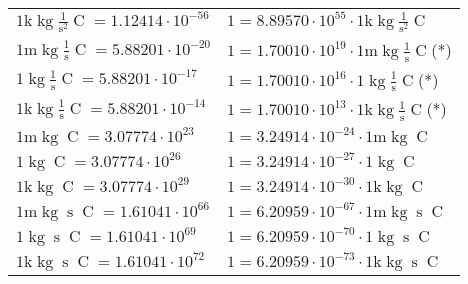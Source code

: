 \begin{center}
\begin{longtable}{l l}
{\color{gray}$1 \bm{\mathrm{ k}}\operatorname{kg}{}\frac1{\operatorname{s}^2}{\operatorname{C}}{} = 1.12414\cdot10^{-56} $}   & {\color{gray}$ 1 = 8.89570\cdot10^{55} \cdot 1 \bm{\mathrm{ k}}\operatorname{kg}{}\frac1{\operatorname{s}^2}{\operatorname{C}}{}$}  \\
{\color{gray}$1 \bm{\mathrm{ m}}\operatorname{kg}{}\frac1{\operatorname{s}}{\operatorname{C}}{} = 5.88201\cdot10^{-20} $}   & {\color{gray}$ 1 = 1.70010\cdot10^{19} \cdot 1 \bm{\mathrm{ m}}\operatorname{kg}{}\frac1{\operatorname{s}}{\operatorname{C}}{}$}\quad(*)\\
{\color{black}$1 \bm{\mathrm{ }}\operatorname{kg}{}\frac1{\operatorname{s}}{\operatorname{C}}{} = 5.88201\cdot10^{-17} $}   & {\color{black}$ 1 = 1.70010\cdot10^{16} \cdot 1 \bm{\mathrm{ }}\operatorname{kg}{}\frac1{\operatorname{s}}{\operatorname{C}}{}$}\quad(*)\\
{\color{gray}$1 \bm{\mathrm{ k}}\operatorname{kg}{}\frac1{\operatorname{s}}{\operatorname{C}}{} = 5.88201\cdot10^{-14} $}   & {\color{gray}$ 1 = 1.70010\cdot10^{13} \cdot 1 \bm{\mathrm{ k}}\operatorname{kg}{}\frac1{\operatorname{s}}{\operatorname{C}}{}$}\quad(*)\\
{\color{gray}$1 \bm{\mathrm{ m}}\operatorname{kg}{}{}{\operatorname{C}}{} = 3.07774\cdot10^{23} $}   & {\color{gray}$ 1 = 3.24914\cdot10^{-24} \cdot 1 \bm{\mathrm{ m}}\operatorname{kg}{}{}{\operatorname{C}}{}$}  \\
{\color{black}$1 \bm{\mathrm{ }}\operatorname{kg}{}{}{\operatorname{C}}{} = 3.07774\cdot10^{26} $}   & {\color{black}$ 1 = 3.24914\cdot10^{-27} \cdot 1 \bm{\mathrm{ }}\operatorname{kg}{}{}{\operatorname{C}}{}$}  \\
{\color{gray}$1 \bm{\mathrm{ k}}\operatorname{kg}{}{}{\operatorname{C}}{} = 3.07774\cdot10^{29} $}   & {\color{gray}$ 1 = 3.24914\cdot10^{-30} \cdot 1 \bm{\mathrm{ k}}\operatorname{kg}{}{}{\operatorname{C}}{}$}  \\
{\color{gray}$1 \bm{\mathrm{ m}}\operatorname{kg}{}{\operatorname{s}}{\operatorname{C}}{} = 1.61041\cdot10^{66} $}   & {\color{gray}$ 1 = 6.20959\cdot10^{-67} \cdot 1 \bm{\mathrm{ m}}\operatorname{kg}{}{\operatorname{s}}{\operatorname{C}}{}$}  \\
{\color{black}$1 \bm{\mathrm{ }}\operatorname{kg}{}{\operatorname{s}}{\operatorname{C}}{} = 1.61041\cdot10^{69} $}   & {\color{black}$ 1 = 6.20959\cdot10^{-70} \cdot 1 \bm{\mathrm{ }}\operatorname{kg}{}{\operatorname{s}}{\operatorname{C}}{}$}  \\
{\color{gray}$1 \bm{\mathrm{ k}}\operatorname{kg}{}{\operatorname{s}}{\operatorname{C}}{} = 1.61041\cdot10^{72} $}   & {\color{gray}$ 1 = 6.20959\cdot10^{-73} \cdot 1 \bm{\mathrm{ k}}\operatorname{kg}{}{\operatorname{s}}{\operatorname{C}}{}$}  \\

\end{longtable}
\end{center}
